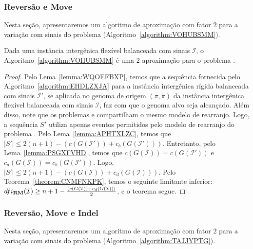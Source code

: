\subsubsection{Reversão e Move}

Nesta seção, apresentaremos um algoritmo de aproximação com fator $2$ para a variação com sinais do problema \SbFIRM{} (Algoritmo~\ref{algorithm:VOHUBSMM}).



\begin{theorem}\label{theorem:NBFXUXJG}
Dada uma instância intergênica flexível balanceada com sinais $\mathcal{I}$, o Algoritmo~\ref{algorithm:VOHUBSMM} é uma $2$-aproximação para o problema \SbFIRM{}.
\end{theorem}
\begin{proof}
Pelo Lema~\ref{lemma:WQOEFBXP}, temos que a sequência fornecida pelo Algoritmo~\ref{algorithm:EHDLZXJA} para a instância intergênica rígida balanceada com sinais $\mathcal{I'}$, se aplicada no genoma de origem $(\pi,\breve\pi)$ da instância intergênica flexível balanceada com sinais $\mathcal{I}$, faz com que o genoma alvo seja alcançado. Além disso, note que os problemas \SbIRM{} e \SbFIRM{} compartilham o mesmo modelo de rearranjo. Logo, a sequência $S'$ utiliza apenas eventos permitidos pelo modelo de rearranjo do problema \SbFIRM{}. Pelo Lema~\ref{lemma:APHTXLZC}, temos que $|S'| \le 2(n + 1) - (c(G(\mathcal{I}')) + c_b(G(\mathcal{I}')))$. Entretanto, pelo Lema~\ref{lemma:PSGXFVHD}, temos que $c(G(\mathcal{I})) = c(G(\mathcal{I}'))$ e $c_d(G(\mathcal{I})) = c_b(G(\mathcal{I}'))$. Logo, $|S'| \le 2(n + 1) - (c(G(\mathcal{I})) + c_d(G(\mathcal{I})))$. Pelo Teorema~\ref{theorem:CNMFNKPK}, temos o seguinte limitante inferior: $dfi_{\textbf{RM}}(\mathcal{I}) \ge {n+1} - \frac{(c(G(\mathcal{I})) + c_d(G(\mathcal{I})))}{2}$, e o teorema segue.
\end{proof}

\subsubsection{Reversão, Move e Indel}

Nesta seção, apresentaremos um algoritmo de aproximação com fator $2$ para a variação com sinais do problema \SbFIRMI{} (Algoritmo~\ref{algorithm:TAJJYPTG}).

